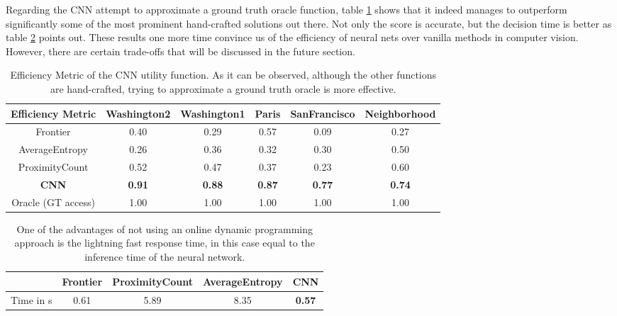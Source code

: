 \documentclass[12pt,twoside]{article}
\theoremstyle{plain}
\theoremstyle{definition}
\theoremstyle{remark}
\begin{document}
Regarding the CNN attempt to approximate a ground truth oracle function, table \ref{tab:hepptable1} shows that it indeed manages to outperform significantly some of the most prominent hand-crafted solutions out there. Not only the score is accurate, but the decision time is better as table \ref{tab:hepptable2} points out. These results one more time convince us of the efficiency of neural nets over vanilla methods in computer vision. However, there are certain trade-offs that will be discussed in the future section.
\begin{table}[H]
\begin{adjustbox}{width=\columnwidth,center}
\begin{tabular}{ |c|c|c|c|c|c| } 
\hline 
 Efficiency Metric & Washington2 & Washington1 & Paris & SanFrancisco & Neighborhood\\
 \hline
 Frontier & 0.40 & 0.29 & 0.57 & 0.09 & 0.27 \\ 
 AverageEntropy \cite{isler2016information}& 0.26 & 0.36 & 0.32 & 0.30 & 0.50 \\ 
 ProximityCount \cite{isler2016information}& 0.52 & 0.47 & 0.37 & 0.23 & 0.60 \\ 
 \textbf{CNN \cite{hepp2018learn}} & \textbf{0.91} & \textbf{0.88} & \textbf{0.87} & \textbf{0.77} & \textbf{0.74} \\
 Oracle (GT access) & 1.00 & 1.00 & 1.00 & 1.00 & 1.00 \\
 \hline
\end{tabular}
\end{adjustbox}
\caption{\label{tab:hepptable1} Efficiency Metric of the CNN utility function. As it can be observed, although the other functions are hand-crafted, trying to approximate a ground truth oracle is more effective.}
\end{table}

\begin{table}[H]
\begin{adjustbox}{width=\columnwidth,center}
\begin{tabular}{ |c|c|c|c|c| } 
\hline
& Frontier & ProximityCount & AverageEntropy & CNN \cite{hepp2018learn}\\
\hline
Time in s & 0.61 & 5.89 & 8.35 & \textbf{0.57}\\
\hline
\end{tabular}
\end{adjustbox}
\caption{\label{tab:hepptable2} One of the advantages of not using an online dynamic programming approach is the lightning fast response time, in this case equal to the inference time of the neural network.}
\end{table}
\end{document}
